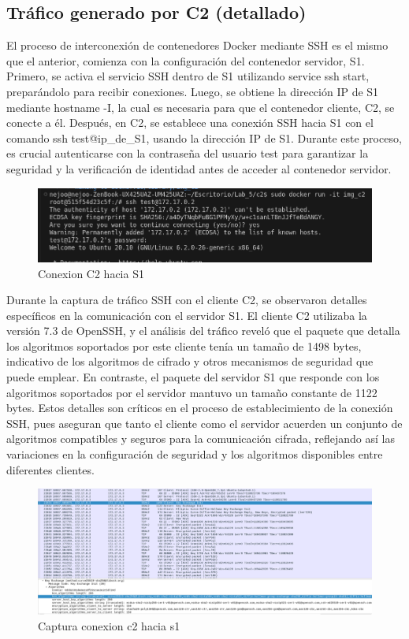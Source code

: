 \documentclass[letter,12pt]{article}
\begin{document}
\subsection{Tráfico generado por C2 (detallado)}
El proceso de interconexión de contenedores Docker mediante SSH es el mismo que el anterior, comienza con la configuración del contenedor servidor, S1. Primero, se activa el servicio SSH dentro de S1 utilizando service ssh start, preparándolo para recibir conexiones. Luego, se obtiene la dirección IP de S1 mediante hostname -I, la cual es necesaria para que el contenedor cliente, C2, se conecte a él. Después, en C2, se establece una conexión SSH hacia S1 con el comando ssh test@ip\_de\_S1, usando la dirección IP de S1. Durante este proceso, es crucial autenticarse con la contraseña del usuario test para garantizar la seguridad y la verificación de identidad antes de acceder al contenedor servidor.
    \begin{figure}[H]
        \centering
        \includegraphics[width=1\textwidth]{img/conexion_c2.png}    
        \caption{Conexion C2 hacia S1}
    \end{figure}
    
Durante la captura de tráfico SSH con el cliente C2, se observaron detalles específicos en la comunicación con el servidor S1. El cliente C2 utilizaba la versión 7.3 de OpenSSH, y el análisis del tráfico reveló que el paquete que detalla los algoritmos soportados por este cliente tenía un tamaño de 1498 bytes, indicativo de los algoritmos de cifrado y otros mecanismos de seguridad que puede emplear. En contraste, el paquete del servidor S1 que responde con los algoritmos soportados por el servidor mantuvo un tamaño constante de 1122 bytes. Estos detalles son críticos en el proceso de establecimiento de la conexión SSH, pues aseguran que tanto el cliente como el servidor acuerden un conjunto de algoritmos compatibles y seguros para la comunicación cifrada, reflejando así las variaciones en la configuración de seguridad y los algoritmos disponibles entre diferentes clientes.
    \begin{figure}[H]
        \centering
        \includegraphics[width=1\textwidth]{img/captura_c2.png}    
        \caption{Captura conexion c2 hacia s1}
    \end{figure}
\end{document}
